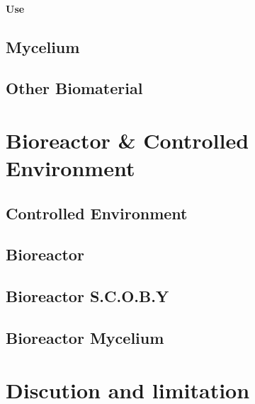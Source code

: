 \paragraph[short]{Use}











\subsection{Mycelium}


\subsection{Other Biomaterial}




















\section{Bioreactor \& Controlled Environment }

\subsection{Controlled Environment} 



















\subsection{Bioreactor}
\subsection{Bioreactor S.C.O.B.Y}
\subsection{Bioreactor Mycelium}



\section{Discution and limitation}